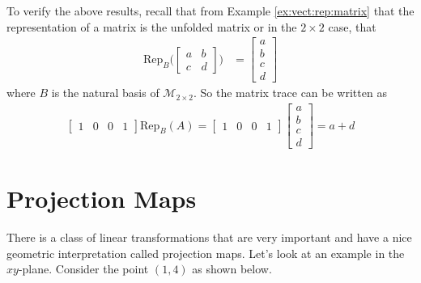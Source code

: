 To verify the above results, recall that from Example \ref{ex:vect:rep:matrix} that the representation of a matrix is the unfolded matrix or in the $2 \times 2$ case, that
%
\begin{align*}
\text{Rep}_B \biggl( \begin{bmatrix}
a & b \\ c & d 
\end{bmatrix}\biggr) & = \begin{bmatrix}
a \\ b \\ c \\ d
\end{bmatrix} 
\end{align*}
where $B$ is the natural basis of $\mathcal{M}_{2 \times 2}$.  So the matrix trace can be written as
%
\begin{align*}
\begin{bmatrix}
1 & 0 & 0 & 1 
\end{bmatrix}\text{Rep}_B (A) = \begin{bmatrix}
1 & 0 & 0 & 1 
\end{bmatrix}\begin{bmatrix}
a \\ b \\ c \\ d
\end{bmatrix} = a + d 
\end{align*}


\section{Projection Maps}  

There is a class of linear transformations that are very important and have a nice geometric interpretation called projection maps.   Let's look at an example in the $xy$-plane.  Consider the point $(1,4)$ as shown below.  

\begin{center}
\end{center}

